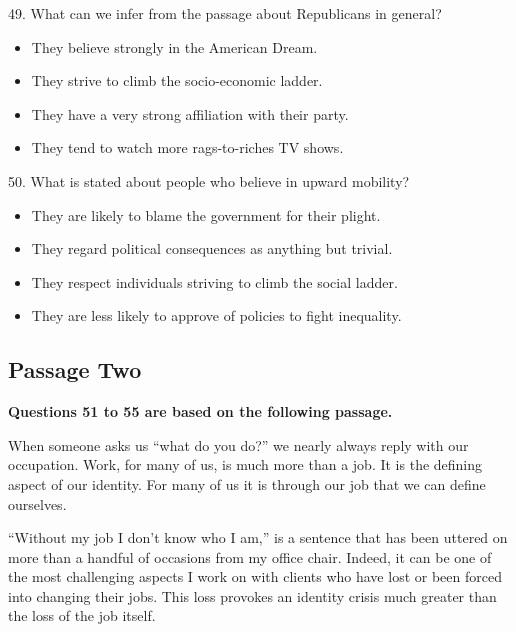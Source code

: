 \documentclass[UTF8,11pt]{ctexart}
\begin{document}
49. What can we infer from the passage about Republicans in general?


\begin{itemize}[leftmargin=2em,itemsep=.2em,topsep=.4em]\item[A.] They believe strongly in the American Dream.
\item[B.] They strive to climb the socio-economic ladder.
\item[C.] They have a very strong affiliation with their party.
\item[D.] They tend to watch more rags-to-riches TV shows.
\end{itemize}

50. What is stated about people who believe in upward mobility?


\begin{itemize}[leftmargin=2em,itemsep=.2em,topsep=.4em]\item[A.] They are likely to blame the government for their plight.
\item[B.] They regard political consequences as anything but trivial.
\item[C.] They respect individuals striving to climb the social ladder.
\item[D.] They are less likely to approve of policies to fight inequality.
\end{itemize}

\subsection*{\textbf{Passage Two}}


\textbf{Questions 51 to 55 are based on the following passage.}


When someone asks us “what do you do?” we nearly always reply with our occupation. Work, for many of us, is much more than a job. It is the defining aspect of our identity. For many of us it is through our job that we can define ourselves.


“Without my job I don’t know who I am,” is a sentence that has been uttered on more than a handful of occasions from my office chair. Indeed, it can be one of the most challenging aspects I work on with clients who have lost or been forced into changing their jobs. This loss provokes an identity crisis much greater than the loss of the job itself.
\end{document}
